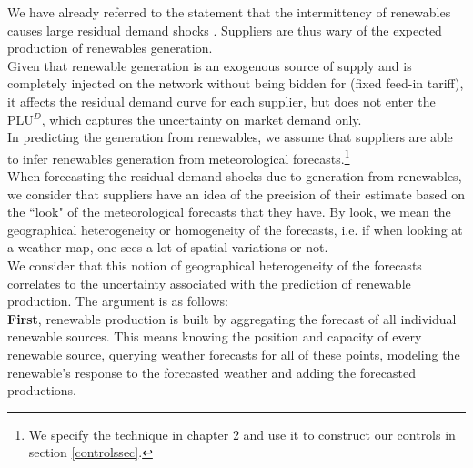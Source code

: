 We have already referred to the statement that the intermittency of renewables causes large residual demand shocks \cite{epexwebsite1}. Suppliers are thus wary of the expected production of renewables generation. \\

Given that renewable generation is an exogenous source of supply and is completely injected on the network without being bidden for (fixed feed-in tariff), it affects the residual demand curve for each supplier, but does not enter the PLU$^D$, which captures the uncertainty on market demand only. \\

In predicting the generation from renewables, we assume that suppliers are able to infer renewables generation from meteorological forecasts.\footnote{We specify the technique in chapter 2 and use it to construct our controls in section \ref{controlssec}.}\\

When forecasting the residual demand shocks due to generation from renewables, we consider that suppliers have an idea of the precision of their estimate based on the ``look" of the meteorological forecasts that they have. By look, we mean the geographical heterogeneity or homogeneity of the forecasts, i.e. if when looking at a weather map, one sees a lot of spatial variations or not. \\

We consider that this notion of geographical heterogeneity of the forecasts correlates to the uncertainty associated with the prediction of renewable production. The argument is as follows: \\

\textbf{First}, renewable production is built by aggregating the forecast of all individual renewable sources. This means knowing the position and capacity of every renewable source, querying weather forecasts for all of these points, modeling the renewable's response to the forecasted weather and adding the forecasted productions. \\

